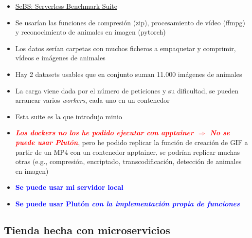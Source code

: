 \documentclass[preprint,3p]{elsarticle}
\begin{document}
\begin{itemize}
	\item \href{https://github.com/spcl/serverless-benchmarks}{SeBS: Serverless Benchmark Suite}
	\item Se usarían las funciones de compresión (zip), procesamiento de vídeo (ffmpg) y reconocimiento de animales en imagen (pytorch)
	\item Los datos serían carpetas con muchos ficheros a empaquetar y comprimir, vídeos e imágenes de animales
	\item Hay 2 datasets usables que en conjunto suman 11.000 imágenes de animales
	\item La carga viene dada por el número de peticiones y su dificultad, se pueden arrancar varios \textit{workers}, cada uno en un contenedor
	\item Esta suite es la que introdujo minio
	\item \textcolor{red}{\textbf{\textit{Los dockers no los he podido ejecutar con apptainer $\Rightarrow$ No se puede usar Plutón}}}, pero he podido replicar la función de creación de GIF a partir de un MP4 con un contenedor apptainer, se podrían replicar muchas otras (e.g., compresión, encriptado, transcodificación, detección de animales en imagen)
	\item \textcolor{blue}{\textbf{Se puede usar mi servidor local}}
	\item \textcolor{blue}{\textbf{Se puede usar Plutón \textit{con la implementación propia de funciones}}}
\end{itemize}

\subsection{Tienda hecha con microservicios}
\end{document}
